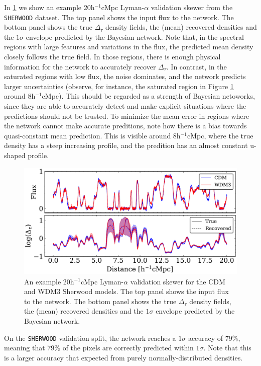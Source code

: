 In \cref{fig: example_recovered_skewer} we show an example 20h$^{-1}$cMpc  Lyman-$\alpha$ validation skewer from the \texttt{SHERWOOD} dataset. The top panel shows the input flux to the network. The bottom panel shows the true $\Delta_\tau$ density fields, the (mean) recovered densities and the $1\sigma$ envelope predicted by the Bayesian network. Note that, in the spectral regions with large features and variations in the flux, the predicted mean density closely follows the true field. In those regions, there is enough physical information for the network to accurately recover $\Delta_\tau$. In contrast, in the saturated regions with low flux, the noise dominates, and the network predicts larger uncertainties (observe, for instance, the saturated region in Figure \ref{fig: example_recovered_skewer} around 8h$^{-1}$cMpc). This should be regarded as a strength of Bayesian netoworks, since they are able to accurately detect and make explicit situations where the predictions should not be trusted. To minimize the mean error in regions where the network cannot make accurate preditions, note how there is a bias towards quasi-constant mean prediction. This is visible around 8h$^{-1}$cMpc, where the true density has a steep increasing profile, and the predition has an almost constant u-shaped profile.

\begin{figure}
    \centering
    \includegraphics[width=0.99\linewidth]{img/ML/skewer.pdf}
    \caption{An example 20h$^{-1}$cMpc Lyman-$\alpha$ validation skewer for the CDM and WDM3 Sherwood models. The top panel shows the input flux to the network. The bottom panel shows the true $\Delta_\tau$ density fields, the (mean) recovered densities and the $1\sigma$ envelope predicted by the Bayesian network.}
    \label{fig: example_recovered_skewer}
\end{figure}
On the \texttt{SHERWOOD} validation split, the network reaches a $1\sigma$ accuracy of $79\%$, meaning that $79\%$ of the pixels are correctly predicted within $1\sigma$. Note that this is a larger accuracy that expected from purely normally-distributed densities.




